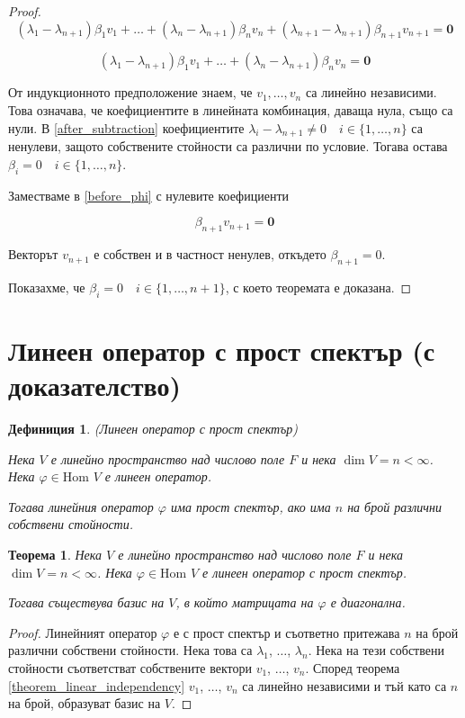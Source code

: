 \documentclass{scrartcl}
\newtheorem{theorem}{Теорема}
\newtheorem{definition}{Дефиниция}
\begin{document}
\begin{FlushLeft}
\begin{proof}
$$(\lambda_1 - \lambda_{n+1})\beta_1 v_1 + \dots + (\lambda_n - \lambda_{n+1})\beta_n v_n + (\lambda_{n+1} - \lambda_{n+1})\beta_{n+1} v_{n+1} = \mathbf{0}$$

\begin{equation}
    (\lambda_1 - \lambda_{n+1})\beta_1 v_1 + \dots + (\lambda_n - \lambda_{n+1})\beta_n v_n = \mathbf{0} \label{after_subtraction}
\end{equation}

От индукционното предположение знаем, че $v_1, \dots, v_n$ са линейно независими. Това означава, че коефициентите в линейната комбинация, даваща нула, също са нули. В \eqref{after_subtraction} коефициентите $\lambda_i - \lambda_{n+1} \ne 0 \quad i \in \{1, \dots, n\}$ са ненулеви, защото собствените стойности са различни по условие. Тогава остава $\beta_i = 0 \quad i \in \{1, \dots, n\}$.

Заместваме в \eqref{before_phi} с нулевите коефициенти

$$\beta_{n+1} v_{n+1} = \mathbf{0}$$

Векторът $v_{n+1}$ е собствен и в частност ненулев, откъдето $\beta_{n+1} = 0$.

Показахме, че $\beta_i = 0 \quad i \in \{1, \dots, n+1\}$, с което теоремата е доказана.
\end{proof}

\section{Линеен оператор с прост спектър (с доказателство)}

\begin{definition}
(Линеен оператор с прост спектър)

Нека $V$ е линейно пространство над числово поле $F$ и нека $\dim V = n < \infty$.
Нека $\varphi \in \text{Hom }{V}$ е линеен оператор.

Тогава линейния оператор $\varphi$ има прост спектър, ако има $n$ на брой различни собствени стойности.
\end{definition}

\begin{theorem}
Нека $V$ е линейно пространство над числово поле $F$ и нека $\dim V = n < \infty$.
Нека $\varphi \in \text{Hom }{V}$ е линеен оператор с прост спектър.

Тогава съществува базис на $V$, в който матрицата на $\varphi$ е диагонална.
\end{theorem}

\begin{proof}
Линейният оператор $\varphi$ е с прост спектър и съответно притежава $n$ на брой различни собствени стойности. Нека това са $\lambda_1$, $\dots$, $\lambda_n$. Нека на тези собствени стойности съответстват собствените вектори $v_1$, $\dots$, $v_n$. Според теорема \ref{theorem_linear_independency} $v_1$, $\dots$, $v_n$ са линейно независими и тъй като са $n$ на брой, образуват базис на $V$.


\end{proof}
\end{FlushLeft}
\end{document}
